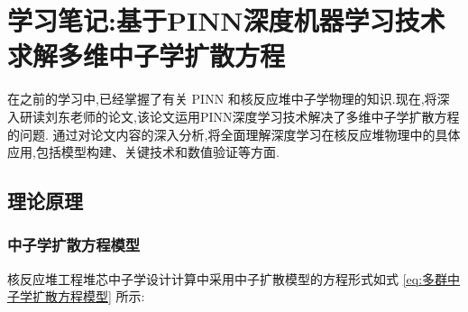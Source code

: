 \documentclass{Sichuan Normal University}
\begin{document}
\section{学习笔记:基于PINN深度机器学习技术求解多维中子学扩散方程}
在之前的学习中,已经掌握了有关 PINN 和核反应堆中子学物理的知识.现在,将深入研读刘东老师的论文,该论文运用PINN深度学习技术解决了多维中子学扩散方程的问题.
通过对论文内容的深入分析,将全面理解深度学习在核反应堆物理中的具体应用,包括模型构建、关键技术和数值验证等方面.
\subsection{理论原理}
\subsubsection{中子学扩散方程模型}
核反应堆工程堆芯中子学设计计算中采用中子扩散模型的方程形式如式 \eqref{eq:多群中子学扩散方程模型} 所示:
\end{document}

